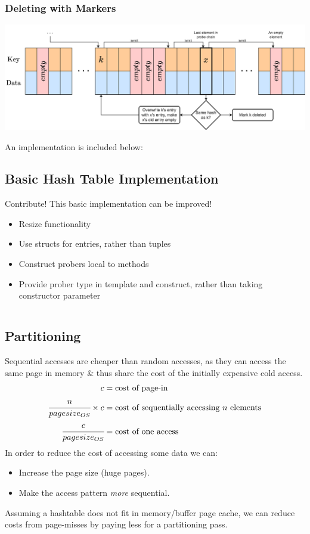 \subsubsection{Deleting with Markers}
\begin{center}
    \includegraphics[width=.8\textwidth]{algorithms_and_indices/images/mark_deletion.drawio.png}
\end{center}
An implementation is included below:
\subsection{Basic Hash Table Implementation}
\begin{sidenotebox}{Contribute!}
    This basic implementation can be improved!
    \begin{itemize}
        \item Resize functionality
        \item Use structs for entries, rather than tuples
        \item Construct probers local to methods
        \item Provide prober type in template and construct, rather than taking constructor parameter
    \end{itemize}
\end{sidenotebox}

\inputminted{cpp}{algorithms_and_indices/code/hashtable.cc}

\subsection{Partitioning}
Sequential accesses are cheaper than random accesses, as they can access the same page in memory \& thus share the cost of the initially expensive cold access.
\[\begin{split}
    c &= \text{cost of page-in } \\
    \cfrac{n}{pagesize_{OS}} \times c  &= \text{cost of sequentially accessing }n \text{ elements}\\
    \cfrac{c}{pagesize_{OS}} &= \text{cost of one access} \\
\end{split}\]
In order to reduce the cost of accessing some data we can:
\begin{itemize}
    \item Increase the page size (huge pages).
    \item Make the access pattern \textit{more} sequential.
\end{itemize}
Assuming a hashtable does not fit in memory/buffer page cache, we can reduce costs from page-misses by paying less for a partitioning pass.

